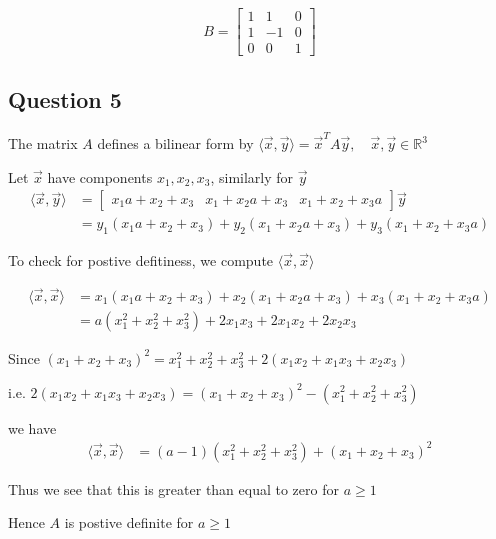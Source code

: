 \documentclass{article}
\begin{document}
\[
B = \begin{bmatrix}
    1 & 1 & 0 \\
    1 & -1 & 0 \\
    0 & 0 & 1
\end{bmatrix}
\]


\subsection*{Question 5}
The matrix \(A\) defines a bilinear form by \(\langle \vec{x} , \vec{y} \rangle = \vec{x}^T A \vec{y}, \quad \vec{x}, \vec{y} \in \mathbb{R}^3\)

Let \(\vec{x}\) have components \(x_1, x_2, x_3\), similarly for \(\vec{y}\)
\begin{align*}
    \langle \vec{x}, \vec{y}\rangle &= \begin{bmatrix}
        x_1 a + x_2 + x_3 & x_1  + x_2 a + x_3 & x_1 + x_2 + x_3 a
    \end{bmatrix} \vec{y} \\
    &= y_1(x_1 a + x_2 + x_3) + y_2(x_1  + x_2 a + x_3) + y_3 (x_1 + x_2 + x_3 a) 
\end{align*}

To check for postive defitiness, we compute \(\langle \vec{x}, \vec{x} \rangle\)

\begin{align*}
    \langle \vec{x}, \vec{x}\rangle &= x_1(x_1 a + x_2 + x_3) + x_2(x_1  + x_2 a + x_3) + x_3 (x_1 + x_2 + x_3 a)  \\
    &= a (x_1^2 + x_2^2 + x_3^2) + 2x_1x_3 + 2x_1x_2 + 2x_2x_3
\end{align*}

Since \((x_1 + x_2 + x_3)^2 = x_1^2+x_2^2+x_3^2 + 2(x_1x_2 + x_1x_3 + x_2x_3)\) 

i.e. \(2(x_1x_2 + x_1x_3 + x_2x_3) = (x_1 + x_2 + x_3)^2 - (x_1^2+x_2^2+x_3^2 ) \)

we have
\begin{align*}
    \langle \vec{x}, \vec{x}\rangle &= (a-1) (x_1^2 + x_2^2 + x_3^2) + (x_1+x_2+x_3)^2
\end{align*}

Thus we see that this is greater than equal to zero for \(a \geq 1\)

Hence \(A\) is postive definite for \(a \geq 1\)
\end{document}
